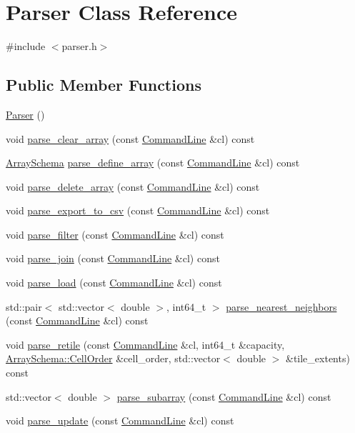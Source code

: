 \hypertarget{classParser}{}\section{Parser Class Reference}
\label{classParser}


{\ttfamily \#include $<$parser.\+h$>$}

\subsection*{Public Member Functions}
\begin{DoxyCompactItemize}
\item 
\hyperlink{classParser_a12234f6cd36b61af4b50c94a179422c1}{Parser} ()
\item 
void \hyperlink{classParser_afd1fd6da376bd42fe65ee39cd1b26ad7}{parse\+\_\+clear\+\_\+array} (const \hyperlink{classCommandLine}{Command\+Line} \&cl) const 
\item 
\hyperlink{classArraySchema}{Array\+Schema} \hyperlink{classParser_af22f5b9c60e63bef0bcf04c5962b7c39}{parse\+\_\+define\+\_\+array} (const \hyperlink{classCommandLine}{Command\+Line} \&cl) const 
\item 
void \hyperlink{classParser_a01d26d45d057f6104d4ce601b165fe64}{parse\+\_\+delete\+\_\+array} (const \hyperlink{classCommandLine}{Command\+Line} \&cl) const 
\item 
void \hyperlink{classParser_aafc63ef884f40804da97b0467f2ad338}{parse\+\_\+export\+\_\+to\+\_\+csv} (const \hyperlink{classCommandLine}{Command\+Line} \&cl) const 
\item 
void \hyperlink{classParser_afdbb0b591ec7c2809a76cb1f3ffa698d}{parse\+\_\+filter} (const \hyperlink{classCommandLine}{Command\+Line} \&cl) const 
\item 
void \hyperlink{classParser_a5e02f7c355bbd90dcc1e897ae8c37722}{parse\+\_\+join} (const \hyperlink{classCommandLine}{Command\+Line} \&cl) const 
\item 
void \hyperlink{classParser_a3679a65a40f169ae617da0e98e149928}{parse\+\_\+load} (const \hyperlink{classCommandLine}{Command\+Line} \&cl) const 
\item 
std\+::pair$<$ std\+::vector$<$ double $>$, int64\+\_\+t $>$ \hyperlink{classParser_afbad9ca8d1627c02c24d31eeec1324bc}{parse\+\_\+nearest\+\_\+neighbors} (const \hyperlink{classCommandLine}{Command\+Line} \&cl) const 
\item 
void \hyperlink{classParser_a6fdc1f75040586b73c05c71d0a0f2d83}{parse\+\_\+retile} (const \hyperlink{classCommandLine}{Command\+Line} \&cl, int64\+\_\+t \&capacity, \hyperlink{classArraySchema_a847601130253f905337b5e284e1b78f2}{Array\+Schema\+::\+Cell\+Order} \&cell\+\_\+order, std\+::vector$<$ double $>$ \&tile\+\_\+extents) const 
\item 
std\+::vector$<$ double $>$ \hyperlink{classParser_a86baecc150569e51af07b6892ba0af8f}{parse\+\_\+subarray} (const \hyperlink{classCommandLine}{Command\+Line} \&cl) const 
\item 
void \hyperlink{classParser_ab033fed6802a2750421714c40b8c6ecc}{parse\+\_\+update} (const \hyperlink{classCommandLine}{Command\+Line} \&cl) const 
\end{DoxyCompactItemize}
